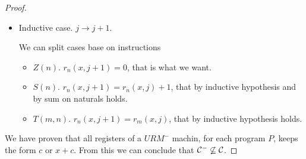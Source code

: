 \documentclass[12pt,a4paper,oneside]{book}
\begin{document}
\begin{exercise}
\begin{proof}
\begin{itemize}
            \item Inductive case. $j \to j + 1$.
            
            We can split cases base on instructions
            \begin{itemize}
                \item $Z(n)$. $r_n(x, j+1) = 0$, that is what we want.
                \item $S(n)$. $r_n(x, j+1) = r_n(x, j) + 1$, that by inductive hypothesis and by sum on naturals holds.
                \item $T(m, n)$. $r_n(x, j + 1) = r_m(x, j)$, that by inductive hypothesis holds.
            \end{itemize}
        \end{itemize}
        
        We have proven that all registers of a $URM^-$ machin, for each program $P$, keeps the form $c$ or $x + c$. From this we can conclude that $\mathcal{C}^- \not\subseteq \mathcal{C}$.
    \end{proof}
    
\end{exercise}
\end{document}
